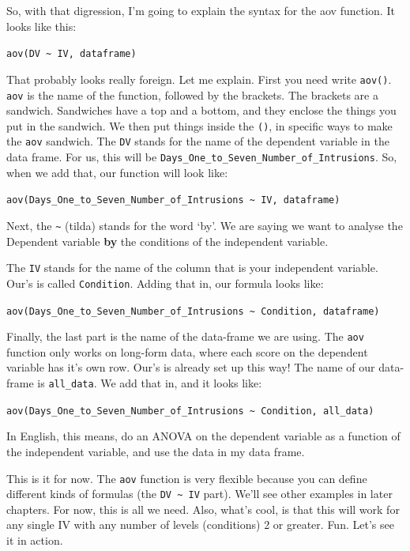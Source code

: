 \documentclass[]{book}
\begin{document}
So, with that digression, I'm going to explain the syntax for the aov
function. It looks like this:

\texttt{aov(DV\ \textasciitilde{}\ IV,\ dataframe)}

That probably looks really foreign. Let me explain. First you need write
\texttt{aov()}. \texttt{aov} is the name of the function, followed by
the brackets. The brackets are a sandwich. Sandwiches have a top and a
bottom, and they enclose the things you put in the sandwich. We then put
things inside the \texttt{()}, in specific ways to make the \texttt{aov}
sandwich. The \texttt{DV} stands for the name of the dependent variable
in the data frame. For us, this will be
\texttt{Days\_One\_to\_Seven\_Number\_of\_Intrusions}. So, when we add
that, our function will look like:

\texttt{aov(Days\_One\_to\_Seven\_Number\_of\_Intrusions\ \textasciitilde{}\ IV,\ dataframe)}

Next, the \texttt{\textasciitilde{}} (tilda) stands for the word `by'.
We are saying we want to analyse the Dependent variable \textbf{by} the
conditions of the independent variable.

The \texttt{IV} stands for the name of the column that is your
independent variable. Our's is called \texttt{Condition}. Adding that
in, our formula looks like:

\texttt{aov(Days\_One\_to\_Seven\_Number\_of\_Intrusions\ \textasciitilde{}\ Condition,\ dataframe)}

Finally, the last part is the name of the data-frame we are using. The
\texttt{aov} function only works on long-form data, where each score on
the dependent variable has it's own row. Our's is already set up this
way! The name of our data-frame is \texttt{all\_data}. We add that in,
and it looks like:

\texttt{aov(Days\_One\_to\_Seven\_Number\_of\_Intrusions\ \textasciitilde{}\ Condition,\ all\_data)}

In English, this means, do an ANOVA on the dependent variable as a
function of the independent variable, and use the data in my data frame.

This is it for now. The \texttt{aov} function is very flexible because
you can define different kinds of formulas (the
\texttt{DV\ \textasciitilde{}\ IV} part). We'll see other examples in
later chapters. For now, this is all we need. Also, what's cool, is that
this will work for any single IV with any number of levels (conditions)
2 or greater. Fun. Let's see it in action.
\end{document}

